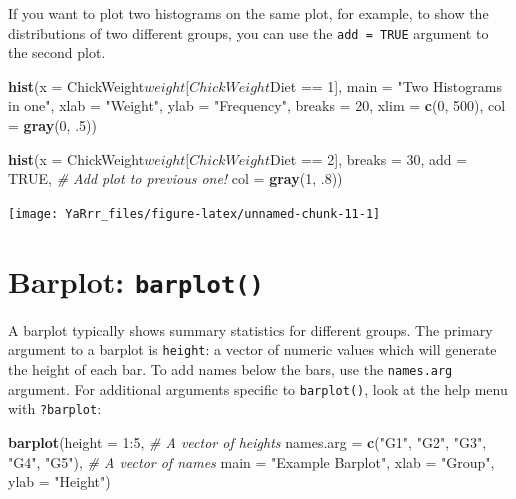 \documentclass[]{book}
\newenvironment{Shaded}{\begin{snugshade}}{\end{snugshade}}
\newcommand{\KeywordTok}[1]{\textcolor[rgb]{0.13,0.29,0.53}{\textbf{{#1}}}}
\newcommand{\DataTypeTok}[1]{\textcolor[rgb]{0.13,0.29,0.53}{{#1}}}
\newcommand{\DecValTok}[1]{\textcolor[rgb]{0.00,0.00,0.81}{{#1}}}
\newcommand{\StringTok}[1]{\textcolor[rgb]{0.31,0.60,0.02}{{#1}}}
\newcommand{\CommentTok}[1]{\textcolor[rgb]{0.56,0.35,0.01}{\textit{{#1}}}}
\newcommand{\OtherTok}[1]{\textcolor[rgb]{0.56,0.35,0.01}{{#1}}}
\newcommand{\NormalTok}[1]{{#1}}
\theoremstyle{definition}
\theoremstyle{definition}
\theoremstyle{remark}
\begin{document}
If you want to plot two histograms on the same plot, for example, to
show the distributions of two different groups, you can use the
\texttt{add = TRUE} argument to the second plot.

\begin{Shaded}
\begin{Highlighting}[]
\KeywordTok{hist}\NormalTok{(}\DataTypeTok{x =} \NormalTok{ChickWeight$weight[ChickWeight$Diet ==}\StringTok{ }\DecValTok{1}\NormalTok{],}
     \DataTypeTok{main =} \StringTok{"Two Histograms in one"}\NormalTok{,}
     \DataTypeTok{xlab =} \StringTok{"Weight"}\NormalTok{,}
     \DataTypeTok{ylab =} \StringTok{"Frequency"}\NormalTok{,}
     \DataTypeTok{breaks =} \DecValTok{20}\NormalTok{,}
     \DataTypeTok{xlim =} \KeywordTok{c}\NormalTok{(}\DecValTok{0}\NormalTok{, }\DecValTok{500}\NormalTok{),}
     \DataTypeTok{col =} \KeywordTok{gray}\NormalTok{(}\DecValTok{0}\NormalTok{, .}\DecValTok{5}\NormalTok{))}

\KeywordTok{hist}\NormalTok{(}\DataTypeTok{x =} \NormalTok{ChickWeight$weight[ChickWeight$Diet ==}\StringTok{ }\DecValTok{2}\NormalTok{],}
     \DataTypeTok{breaks =} \DecValTok{30}\NormalTok{,}
     \DataTypeTok{add =} \OtherTok{TRUE}\NormalTok{, }\CommentTok{# Add plot to previous one!}
     \DataTypeTok{col =} \KeywordTok{gray}\NormalTok{(}\DecValTok{1}\NormalTok{, .}\DecValTok{8}\NormalTok{))}
\end{Highlighting}
\end{Shaded}

\begin{center}\texttt{[image: YaRrr\_files/figure-latex/unnamed-chunk-11-1]} \end{center}

\section{\texorpdfstring{Barplot:
\texttt{barplot()}}{Barplot: barplot()}}\label{barplot-barplot}

A barplot typically shows summary statistics for different groups. The
primary argument to a barplot is \texttt{height}: a vector of numeric
values which will generate the height of each bar. To add names below
the bars, use the \texttt{names.arg} argument. For additional arguments
specific to \texttt{barplot()}, look at the help menu with
\texttt{?barplot}:

\begin{Shaded}
\begin{Highlighting}[]
\KeywordTok{barplot}\NormalTok{(}\DataTypeTok{height =} \DecValTok{1}\NormalTok{:}\DecValTok{5}\NormalTok{,  }\CommentTok{# A vector of heights}
        \DataTypeTok{names.arg =} \KeywordTok{c}\NormalTok{(}\StringTok{"G1"}\NormalTok{, }\StringTok{"G2"}\NormalTok{, }\StringTok{"G3"}\NormalTok{, }\StringTok{"G4"}\NormalTok{, }\StringTok{"G5"}\NormalTok{), }\CommentTok{# A vector of names}
        \DataTypeTok{main =} \StringTok{"Example Barplot"}\NormalTok{, }
        \DataTypeTok{xlab =} \StringTok{"Group"}\NormalTok{, }
        \DataTypeTok{ylab =} \StringTok{"Height"}\NormalTok{)}
\end{Highlighting}
\end{Shaded}
\end{document}
